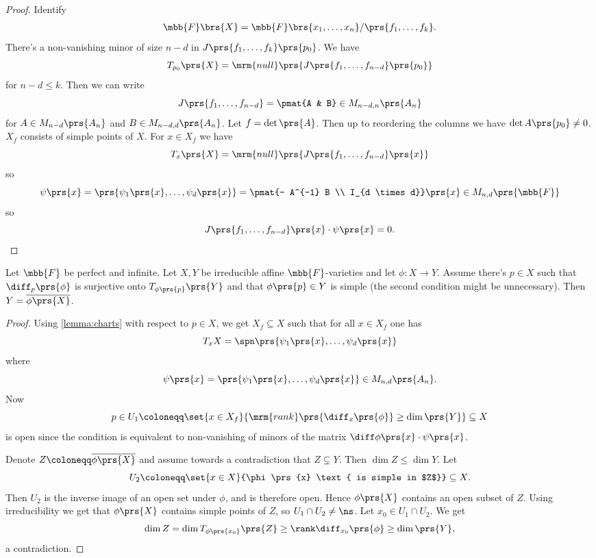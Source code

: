 \documentclass[10pt,a4paper,twoside,openany,hidelinks]{book}
\begin{document}
\begin{proof}
Identify
\begin{align*}
\mbb{F}\brs{X} = \mbb{F}\brs{x_1, \ldots, x_n}/\prs{f_1, \ldots, f_k} \text{.}
\end{align*}
There's a non-vanishing minor of size $n-d$ in $J\prs{f_1, \ldots, f_k}\prs{p_0}$.
We have
\[T_{p_0}\prs{X} = \mrm{null}\prs{J\prs{f_1, \ldots, f_{n-d}}\prs{p_0}}\]
for $n-d \leq k$.
Then we can write
\[J\prs{f_1, \ldots, f_{n-d}} = \pmat{A & B} \in M_{n-d,n}\prs{A_n}\]
for $A \in M_{n-d}\prs{A_n}$ and $B \in M_{n-d,d}\prs{A_n}$.
Let $f = \det\prs{A}$. Then up to reordering the columns we have $\det A\prs{p_0} \neq 0$.
$X_f$ consists of simple points of $X$. For $x \in X_f$ we have
\[T_x\prs{X} = \mrm{null}\prs{J\prs{f_1, \ldots, f_{n-d}}\prs{x}}\]
so
\[\psi\prs{x} = \prs{\psi_1\prs{x}, \ldots, \psi_d\prs{x}} = \pmat{- A^{-1} B \\ I_{d \times d}}\prs{x} \in M_{n,d}\prs{\mbb{F}}\]
so
\[J\prs{f_1, \ldots, f_{n-d}}\prs{x} \cdot \psi\prs{x} = 0 \text{.}\]
\end{proof}

\begin{proposition}
Let $\mbb{F}$ be perfect and infinite.
Let $X,Y$ be irreducible affine $\mbb{F}$-varieties and let $\phi \colon X \to Y$.
Assume there's $p \in X$ such that $\diff_p \prs{\phi}$ is surjective onto $T_{\phi\prs{p}}\prs{Y}$ and that $\phi\prs{p} \in Y$ is simple (the second condition might be unnecessary).
Then $Y = \overline{\phi\prs{X}}$.
\end{proposition}

\begin{proof}
Using \ref{lemma:charts} with respect to $p \in X$, we get $X_f \subseteq X$ such that for all $x \in X_f$ one has
\[T_x X = \spn\prs{\psi_1\prs{x}, \ldots, \psi_d\prs{x}}\]
where
\[\psi\prs{x} = \prs{\psi_1\prs{x}, \ldots, \psi_d\prs{x}} \in M_{n,d}\prs{A_n} \text{.}\]
Now
\[p \in U_1 \coloneqq \set{x \in X_f}{\mrm{rank}\prs{\diff_x\prs{\phi}} \geq \dim\prs{Y}} \subseteq X\]
is open since the condition is equivalent to non-vanishing of minors of the matrix $\diff \phi\prs{x} \cdot \psi\prs{x}$.

Denote $Z \coloneqq \overline{\phi\prs{X}}$ and assume towards a contradiction that $Z \subsetneq Y$. Then $\dim Z \leq \dim Y$. Let
\[U_2 \coloneqq \set{x \in X}{\phi\prs{x} \text{ is simple in $Z$}} \subseteq X \text{.}\]
Then $U_2$ is the inverse image of an open set under $\phi$, and is therefore open. Hence $\phi\prs{X}$ contains an open subset of $Z$. Using irreducibility we get that $\phi\prs{X}$ contains simple points of $Z$, so $U_1 \cap U_2 \neq \ns$.
Let $x_0 \in U_1 \cap U_2$. We get
\[\dim Z = \dim T_{\phi\prs{x_0}}\prs{Z} \geq \rank \diff_{x_0}\prs{\phi} \geq \dim\prs{Y} \text{,}\]
a contradiction.
\end{proof}
\end{document}
